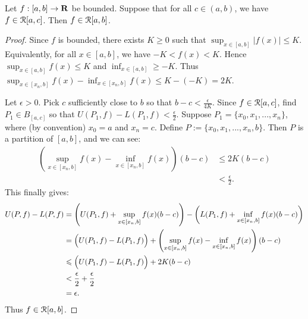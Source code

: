 \documentclass[10pt,twoside,openany]{memoir}
\begin{document}
    \begin{theorem}\label{thm:locally-inte}
        Let $f:[a,b] \rightarrow \bfR$ be bounded. Suppose that for all $c \in (a,b)$, we have $f \in \cR[a,c]$. Then $f \in \cR[a,b]$.
    \end{theorem}
        \begin{proof}
            Since $f$ is bounded, there exists $K \geq 0$ such that $\sup_{x \in [a,b]}|f(x)| \leq K$. Equivalently, for all $x \in [a,b]$, we have $-K < f(x) < K$. Hence $\sup_{x \in [a,b]}f(x) \leq K$ and $\inf_{x \in [a,b]} \geq -K$. Thus $\sup_{x \in [x_n,b]}f(x) - \inf_{x \in [x_n,b]}f(x) \leq K - (-K) = 2K$.
            
            Let $\epsilon > 0$. Pick $c$ sufficiently close to $b$ so that $b - c < \frac{\epsilon}{4K}$. Since $f \in \cR[a,c]$, find $P_1 \in B_{[a,c]}$ so that $U(P_1,f) - L(P_1,f) < \frac{\epsilon}{2}$. Suppose $P_1 = \{x_0,x_1,...,x_n\}$, where (by convention) $x_0 = a$ and $x_n = c$. Define $P := \{x_0,x_1,...,x_n,b\}$. Then $P$ is a partition of $[a,b]$, and we can see:
                \begin{equation*}
                \begin{split}
                    \left(\sup_{x \in [x_n,b]}f(x) - \inf_{x \in [x_n,b]}f(x)\right)(b-c)
                    & \leq 2K(b-c) \\
                    & < \frac{\epsilon}{2}.
                \end{split}
                \end{equation*} 
            This finally gives:
                \begin{equation*}
                \begin{split}
                    U(P,f) - L(P,f)
                    & = \left(U(P_1,f) + \sup_{x \in [x_n,b]}f(x)(b-c)\right) - \left(L(P_1,f) + \inf_{x \in [x_n,b]}f(x)(b-c)\right) \\
                    & = \Bigl( U(P_1,f) - L(P_1,f) \Bigr) + \left(\sup_{x \in [x_n,b]}f(x) - \inf_{x \in [x_n,b]}f(x)\right)(b-c) \\
                    & \leq \Bigl( U(P_1,f) - L(P_1,f) \Bigr) + 2K(b-c) \\
                    & < \frac{\epsilon}{2} + \frac{\epsilon}{2} \\
                    & = \epsilon.
                \end{split}
                \end{equation*}
            Thus $f \in \cR[a,b]$.
        \end{proof}
\end{document}

